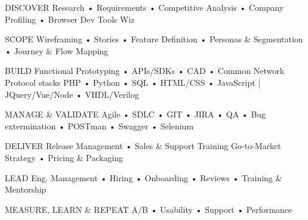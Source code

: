 

\begin{cvskills}

  \cvskill
    {DISCOVER} %
    {Research • Requirements • Competitive Analysis • Company Profiling • Browser Dev Tools Wiz} %

  \cvskill
    {SCOPE} %
    {Wireframing • Stories • Feature Definition • Personas \& Segmentation • Journey \& Flow Mapping} %

  \cvskill
    {BUILD} %
    {Functional Prototyping • APIs/SDKs • CAD • Common Network Protocol stacks \newline
    PHP • Python • SQL • HTML/CSS • JavaScript | JQuery/Vue/Node • VHDL/Verilog} %

  \cvskill
    {MANAGE \& VALIDATE} %
    {Agile • SDLC • GIT • JIRA • QA • Bug extermination • POSTman • Swagger • Selenium} %

  \cvskill
    {DELIVER} %
    {Release Management • Sales \& Support Training \newline
    Go-to-Market Strategy • Pricing \& Packaging } %

  \cvskill
    {LEAD} %
    {Eng. Management • Hiring • Onboarding • Reviews • Training \& Mentorship} %

  \cvskill
    {MEASURE, LEARN \& REPEAT} %
    {A/B • Usability • Support • Performance} %


\end{cvskills}
